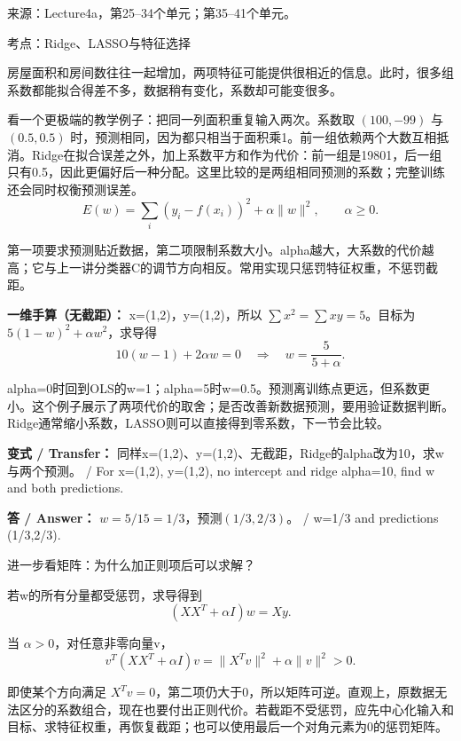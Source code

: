 来源：Lecture4a，第25–34个单元；第35–41个单元。








考点：Ridge、LASSO与特征选择

房屋面积和房间数往往一起增加，两项特征可能提供很相近的信息。此时，很多组系数都能拟合得差不多，数据稍有变化，系数却可能变很多。


看一个更极端的教学例子：把同一列面积重复输入两次。系数取 \((100,-99)\) 与 \((0.5,0.5)\) 时，预测相同，因为都只相当于面积乘1。前一组依赖两个大数互相抵消。Ridge在拟合误差之外，加上系数平方和作为代价：前一组是19801，后一组只有0.5，因此更偏好后一种分配。这里比较的是两组相同预测的系数；完整训练还会同时权衡预测误差。
\[
E(w)=\sum_i(y_i-f(x_i))^2+\alpha\|w\|^2,\qquad\alpha\ge0.\tag{4.8}
\]


第一项要求预测贴近数据，第二项限制系数大小。alpha越大，大系数的代价越高；它与上一讲分类器C的调节方向相反。常用实现只惩罚特征权重，不惩罚截距。


\textbf{一维手算（无截距）：} x=(1,2)，y=(1,2)，所以 \(\sum x^2=\sum xy=5\)。目标为 \(5(1-w)^2+\alpha w^2\)，求导得
\[
10(w-1)+2\alpha w=0
\quad\Rightarrow\quad w=\frac5{5+\alpha}.\tag{4.9}
\]


alpha=0时回到OLS的w=1；alpha=5时w=0.5。预测离训练点更远，但系数更小。这个例子展示了两项代价的取舍；是否改善新数据预测，要用验证数据判断。Ridge通常缩小系数，LASSO则可以直接得到零系数，下一节会比较。


\textbf{变式 / Transfer：} 同样x=(1,2)、y=(1,2)、无截距，Ridge的alpha改为10，求w与两个预测。 / For x=(1,2), y=(1,2), no intercept and ridge alpha=10, find w and both predictions.


\textbf{答 / Answer：} \(w=5/15=1/3\)，预测\((1/3,2/3)\)。 / w=1/3 and predictions (1/3,2/3).



\begin{StudySolution}{进一步看矩阵：为什么加正则项后可以求解？}


若w的所有分量都受惩罚，求导得到
\[
(XX^T+\alpha I)w=Xy.\tag{4.10}
\]


当 \(\alpha>0\)，对任意非零向量v，
\[
v^T(XX^T+\alpha I)v=\|X^Tv\|^2+\alpha\|v\|^2>0.\tag{4.11}
\]


即使某个方向满足 \(X^Tv=0\)，第二项仍大于0，所以矩阵可逆。直观上，原数据无法区分的系数组合，现在也要付出正则代价。若截距不受惩罚，应先中心化输入和目标、求特征权重，再恢复截距；也可以使用最后一个对角元素为0的惩罚矩阵。


\end{StudySolution}


